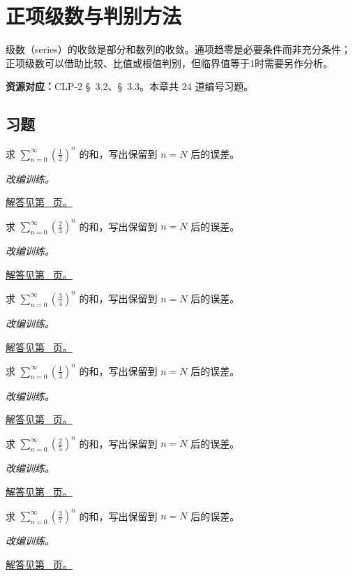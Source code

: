 \documentclass[12pt,fontset=fandol]{ctexart}
\begin{document}
\clearpage
\section{正项级数与判别方法}\label{sec:ch24}
级数（series）的收敛是部分和数列的收敛。通项趋零是必要条件而非充分条件；正项级数可以借助比较、比值或根值判别，但临界值等于1时需要另作分析。

\textbf{资源对应：}CLP-2 \S~3.2、\S~3.3。本章共 24 道编号习题。
\subsection{习题}
\begin{example}[几何级数与尾项]\label{ex:c24q1}
求 $\displaystyle\sum_{n=0}^\infty(\frac{1}{2})^n$ 的和，写出保留到 $n=N$ 后的误差。
\par\textit{改编训练。}\par\hyperref[ans:c24q1]{解答见第~\pageref{ans:c24q1} 页。}
\end{example}
\begin{example}[几何级数与尾项]\label{ex:c24q2}
求 $\displaystyle\sum_{n=0}^\infty(\frac{2}{3})^n$ 的和，写出保留到 $n=N$ 后的误差。
\par\textit{改编训练。}\par\hyperref[ans:c24q2]{解答见第~\pageref{ans:c24q2} 页。}
\end{example}
\begin{example}[几何级数与尾项]\label{ex:c24q3}
求 $\displaystyle\sum_{n=0}^\infty(\frac{3}{4})^n$ 的和，写出保留到 $n=N$ 后的误差。
\par\textit{改编训练。}\par\hyperref[ans:c24q3]{解答见第~\pageref{ans:c24q3} 页。}
\end{example}
\begin{example}[几何级数与尾项]\label{ex:c24q4}
求 $\displaystyle\sum_{n=0}^\infty(\frac{1}{3})^n$ 的和，写出保留到 $n=N$ 后的误差。
\par\textit{改编训练。}\par\hyperref[ans:c24q4]{解答见第~\pageref{ans:c24q4} 页。}
\end{example}
\begin{example}[几何级数与尾项]\label{ex:c24q5}
求 $\displaystyle\sum_{n=0}^\infty(\frac{2}{5})^n$ 的和，写出保留到 $n=N$ 后的误差。
\par\textit{改编训练。}\par\hyperref[ans:c24q5]{解答见第~\pageref{ans:c24q5} 页。}
\end{example}
\begin{example}[几何级数与尾项]\label{ex:c24q6}
求 $\displaystyle\sum_{n=0}^\infty(\frac{3}{7})^n$ 的和，写出保留到 $n=N$ 后的误差。
\par\textit{改编训练。}\par\hyperref[ans:c24q6]{解答见第~\pageref{ans:c24q6} 页。}
\end{example}
\end{document}
